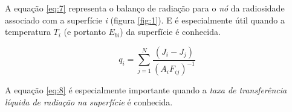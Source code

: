 A equação \ref{eq:7} representa o balanço de radiação para o \textit{nó} da radiosidade associado com a superfície \textit{i} (figura \ref{fig:1}). E é especialmente útil quando a temperatura $T_{i}$ (e portanto $E_{bi}$) da superfície é conhecida.

\begin{equation}
q_{i} = \sum _{j=1}^{N} \frac{(  J_{i} - J_{j}  )} {(A_{i}F_{ij})^{-1}}
\label{eq:8}
\end{equation}

A equação \ref{eq:8} é especialmente importante quando a \textit{taxa de transferência líquida de radiação na superfície} é conhecida.